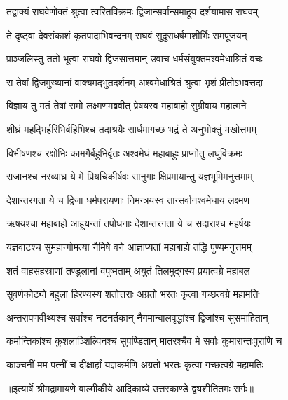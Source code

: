 \twolineshloka
{तद्वाक्यं राघवेणोक्तं श्रुत्वा त्वरितविक्रमः}
{द्विजान्सर्वान्समाहूय दर्शयामास राघवम्} %

\twolineshloka
{ते दृष्ट्वा देवसंकाशं कृतपादाभिवन्दनम्}
{राघवं सुदुराधर्षमाशीर्भिः समपूजयन्} %

\twolineshloka
{प्राञ्जलिस्तु ततो भूत्वा राघवो द्विजसात्तमान्}
{उवाच धर्मसंयुक्तमश्वमेधाश्रितं वचः} %

\twolineshloka
{स तेषां द्विजमुख्यानां वाक्यमद्भुतदर्शनम्}
{अश्वमेधाश्रितं श्रुत्वा भृशं प्रीतोऽभवत्तदा} %

\twolineshloka
{विज्ञाय तु मतं तेषां रामो लक्ष्मणमब्रवीत्}
{प्रेषयस्व महाबाहो सुग्रीवाय महात्मने} %

\twolineshloka
{शीघ्रं महद्भिर्हरिभिर्बहिभिश्च तदाश्रयैः}
{सार्धमागच्छ भद्रं ते अनुभोक्तुं मखोत्तमम्} %

\twolineshloka
{विभीषणश्च रक्षोभिः कामगैर्बहुभिर्वृतः}
{अश्वमेधं महाबाहुः प्राप्नोतु लघुविक्रमः} %

\twolineshloka
{राजानश्च नरव्याघ्र ये मे प्रियचिकीर्षवः}
{सानुगाः क्षिप्रमायान्तु यज्ञभूमिमनुत्तमाम्} %

\twolineshloka
{देशान्तरगता ये च द्विजा धर्मपरायणाः}
{निमन्त्रयस्व तान्सर्वानश्वमेधाय लक्ष्मण} %

\twolineshloka
{ऋषयश्चा महाबाहो आहूयन्तां तपोधनाः}
{देशान्तरगता ये च सदाराश्च महर्षयः} %

\twolineshloka
{यज्ञवाटश्च सुमहान्गोमत्या नैमिषे वने}
{आज्ञाप्यतां महाबाहो तद्धि पुण्यमनुत्तमम्} %

\twolineshloka
{शतं वाहसहस्राणां तण्डुलानां वपुष्मताम्}
{अयुतं तिलमुद्गस्य प्रयात्वग्रे महाबल} %

\twolineshloka
{सुवर्णकोट्यो बहुला हिरण्यस्य शतोत्तराः}
{अग्रतो भरतः कृत्वा गच्छत्वग्रे महामतिः} %

\twolineshloka
{अन्तरापणवीथ्यश्च सर्वांश्च नटनर्तकान्}
{नैगमान्बालवृद्धांश्च द्विजांश्च सुसमाहितान्} %

\twolineshloka
{कर्मान्तिकांश्च कुशलाञ्शिल्पिनश्च सुपण्डितान्}
{मातरश्चैव मे सर्वाः कुमारान्तःपुराणि च} %

\twolineshloka
{काञ्चनीं मम पत्नीं च दीक्षार्हां यज्ञकर्मणि}
{अग्रतो भरतः कृत्वा गच्छत्वग्रे महामतिः} %


{॥इत्यार्षे श्रीमद्रामायणे वाल्मीकीये आदिकाव्ये उत्तरकाण्डे द्व्यशीतितमः सर्गः॥}


